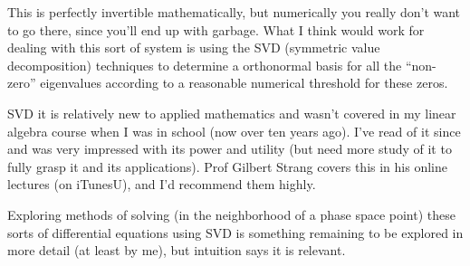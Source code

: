 This is perfectly invertible mathematically, but numerically you really don't want to go there, since you'll end up with garbage.  What I think would work for dealing with this sort of system is using the SVD (symmetric value decomposition) techniques to determine a orthonormal basis for all the ``non-zero'' eigenvalues according to a reasonable numerical threshold for these zeros.  

SVD it is relatively new to applied mathematics and wasn't covered in my linear algebra course when I was in school (now over ten years ago).  I've read of it since and was very impressed with its power and utility (but need more study of it to fully grasp it and its applications).  Prof Gilbert Strang covers this in his online lectures (on iTunesU), and I'd recommend them highly.

Exploring methods of solving (in the neighborhood of a phase space point) these sorts of differential equations using SVD is something remaining to be explored in more detail (at least by me), but intuition says it is relevant.

\EndNoBibArticle
